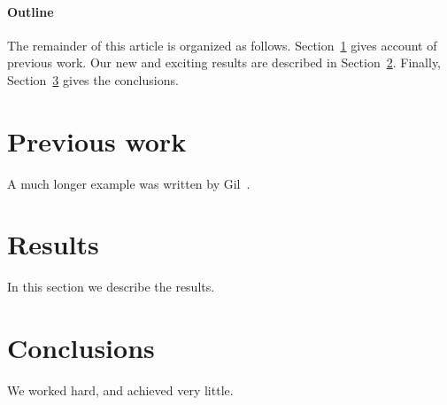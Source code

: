 \documentclass[12pt]{article}
\begin{document}
\paragraph{Outline}
The remainder of this article is organized as follows.
Section~\ref{previous work} gives account of previous work.
Our new and exciting results are described in Section~\ref{results}.
Finally, Section~\ref{conclusions} gives the conclusions.

\section{Previous work}\label{previous work}
A much longer \LaTeXe{} example was written by Gil~\cite{Gil:02}.

\section{Results}\label{results}
In this section we describe the results.

\section{Conclusions}\label{conclusions}
We worked hard, and achieved very little.

%
%
\end{document}
